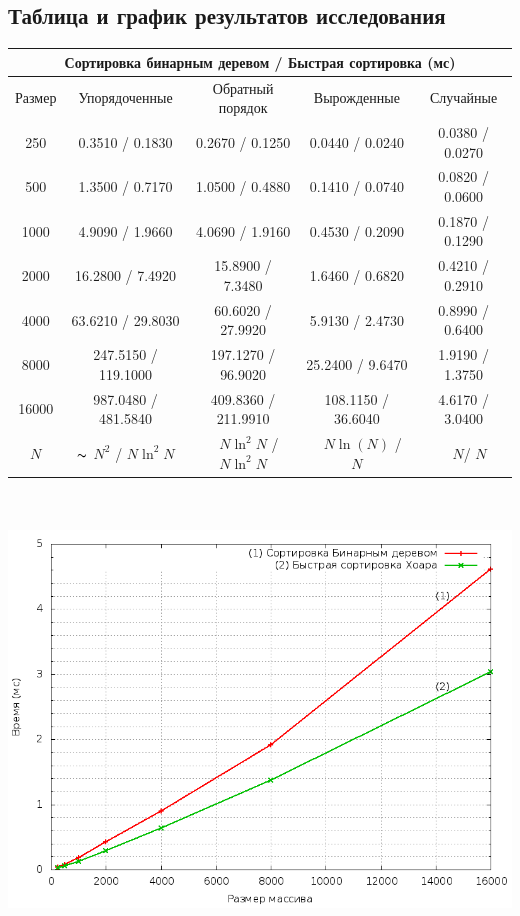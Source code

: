 \documentclass[a4paper,11pt]{article}
\begin{document}
\begin{center}
\section{Таблица и график результатов исследования}
\end{center}

\begin{flushright}
\begin{tabular}{|c|c|c|c|c|}
\hline
\multicolumn{5}{|c|}{Сортировка бинарным деревом / Быстрая сортировка (мс)}\\
\hline
   Размер&Упорядоченные&Обратный порядок&Вырожденные&Случайные\\
\hline
    250&0.3510 / 0.1830&0.2670 / 0.1250&0.0440 / 0.0240&0.0380 / 0.0270\\  
\hline
    500&1.3500 / 0.7170&1.0500 / 0.4880&0.1410 / 0.0740&0.0820 / 0.0600\\  
\hline
   1000&4.9090 / 1.9660&4.0690 / 1.9160&0.4530 / 0.2090&0.1870 / 0.1290\\   
\hline
   2000&16.2800 / 7.4920&15.8900 / 7.3480&1.6460 / 0.6820&0.4210 / 0.2910\\
\hline
   4000&63.6210 / 29.8030&60.6020 / 27.9920&5.9130 / 2.4730&0.8990 / 0.6400\\  
\hline
   8000&247.5150 / 119.1000&197.1270 / 96.9020&25.2400 / 9.6470&1.9190 / 1.3750\\    
\hline
  16000&987.0480 / 481.5840&409.8360 / 211.9910&108.1150 / 36.6040&4.6170 / 3.0400\\    
\hline
  $N$& $\thicksim$ $N^2$ / $N \ln^2 N$ & ~ $N \ln^2N$ / $N \ln^2N$ & ~ $N \ln(N)$ / $N$ & ~ $N$/ $N$\\ 
\hline
\end{tabular}
\end{flushright}

\begin{center}
\includegraphics[height=12cm]{./graphic.png}
\end{center}\\
\end{document}
